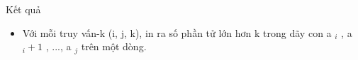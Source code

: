 Kết quả
\begin{itemize}
	\item     Với mỗi truy vấn-k (i, j, k), in ra số phần tử lớn hơn k trong dãy con a    $_     i    $    ,   a    $_     i+1    $    , ..., a    $_     j    $    trên một dòng.    


\end{itemize}